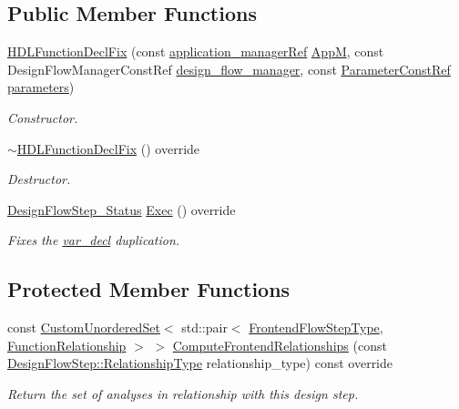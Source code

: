 \subsection*{Public Member Functions}
\begin{DoxyCompactItemize}
\item 
\hyperlink{classHDLFunctionDeclFix_a4f766168161e512af7835f42d6d3374c}{H\+D\+L\+Function\+Decl\+Fix} (const \hyperlink{application__manager_8hpp_a04ccad4e5ee401e8934306672082c180}{application\+\_\+manager\+Ref} \hyperlink{classFrontendFlowStep_a0ac0d8db2a378416583f51c4faa59d15}{AppM}, const Design\+Flow\+Manager\+Const\+Ref \hyperlink{classDesignFlowStep_ab770677ddf087613add30024e16a5554}{design\+\_\+flow\+\_\+manager}, const \hyperlink{Parameter_8hpp_a37841774a6fcb479b597fdf8955eb4ea}{Parameter\+Const\+Ref} \hyperlink{classDesignFlowStep_a802eaafe8013df706370679d1a436949}{parameters})
\begin{DoxyCompactList}\small\item\em Constructor. \end{DoxyCompactList}\item 
\hyperlink{classHDLFunctionDeclFix_a5fecf6542050fa10da6b8830fcd749ba}{$\sim$\+H\+D\+L\+Function\+Decl\+Fix} () override
\begin{DoxyCompactList}\small\item\em Destructor. \end{DoxyCompactList}\item 
\hyperlink{design__flow__step_8hpp_afb1f0d73069c26076b8d31dbc8ebecdf}{Design\+Flow\+Step\+\_\+\+Status} \hyperlink{classHDLFunctionDeclFix_aea64c6af343b3a2cebbfd0dda66cb1e1}{Exec} () override
\begin{DoxyCompactList}\small\item\em Fixes the \hyperlink{structvar__decl}{var\+\_\+decl} duplication. \end{DoxyCompactList}\end{DoxyCompactItemize}
\subsection*{Protected Member Functions}
\begin{DoxyCompactItemize}
\item 
const \hyperlink{classCustomUnorderedSet}{Custom\+Unordered\+Set}$<$ std\+::pair$<$ \hyperlink{frontend__flow__step_8hpp_afeb3716c693d2b2e4ed3e6d04c3b63bb}{Frontend\+Flow\+Step\+Type}, \hyperlink{classFrontendFlowStep_af7cf30f2023e5b99e637dc2058289ab0}{Function\+Relationship} $>$ $>$ \hyperlink{classHDLFunctionDeclFix_a51ce4742382debdcc01004a08bafbcae}{Compute\+Frontend\+Relationships} (const \hyperlink{classDesignFlowStep_a723a3baf19ff2ceb77bc13e099d0b1b7}{Design\+Flow\+Step\+::\+Relationship\+Type} relationship\+\_\+type) const override
\begin{DoxyCompactList}\small\item\em Return the set of analyses in relationship with this design step. \end{DoxyCompactList}\end{DoxyCompactItemize}
